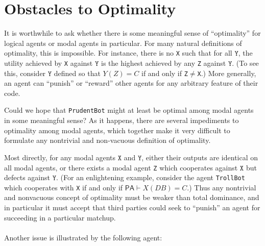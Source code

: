 \documentclass[12pt, letterpaper]{article}
\numberwithin{equation}{section}
\begin{document}
\section{Obstacles to Optimality}
\label{optimality}

It is worthwhile to ask whether there is some meaningful sense of ``optimality'' for logical agents or modal agents in particular. For many natural definitions of optimality, this is impossible. For instance, there is no \texttt{X} such that for all $\texttt{Y}$, the utility achieved by \texttt{X} against $\texttt{Y}$ is the highest achieved by any \texttt{Z} against $\texttt{Y}$. (To see this, consider $\texttt{Y}$ defined so that $Y(Z)=C$ if and only if \texttt{Z}$\neq$\texttt{X}.) More generally, an agent can ``punish'' or ``reward'' other agents for any arbitrary feature of their code.

Could we hope that \texttt{PrudentBot} might at least be optimal among modal agents in some meaningful sense? As it happens, there are several impediments to optimality among modal agents, which together make it very difficult to formulate any nontrivial and non-vacuous definition of optimality.

Most directly, for any modal agents $\texttt{X}$ and $\texttt{Y}$, either their outputs are identical on all modal agents, or there exists a modal agent \texttt{Z} which cooperates against $\texttt{X}$ but defects against $\texttt{Y}$. (For an enlightening example, consider the agent \texttt{TrollBot} which cooperates with \texttt{X} if and only if $\textsf{PA}\vdash X(DB)=C$.) Thus any nontrivial and nonvacuous concept of optimality must be weaker than total dominance, and in particular it must accept that third parties could seek to ``punish'' an agent for succeeding in a particular matchup.\\
\\
Another issue is illustrated by the following agent:
\end{document}
